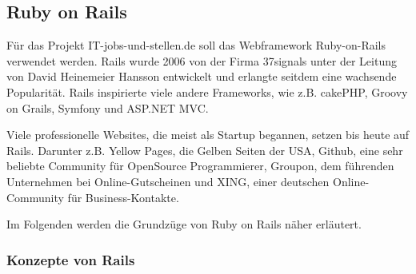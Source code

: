 
\subsection{Ruby on Rails}

Für das Projekt IT-jobs-und-stellen.de soll das Webframework Ruby-on-Rails verwendet werden. Rails wurde 2006 von der Firma 37signals unter der Leitung von David Heinemeier Hansson entwickelt und erlangte seitdem eine wachsende Popularität. Rails inspirierte viele andere Frameworks, wie z.B. cakePHP, Groovy on Grails, Symfony und ASP.NET MVC.

Viele professionelle Websites, die meist als Startup begannen, setzen bis heute auf Rails. Darunter z.B. Yellow Pages, die Gelben Seiten der USA, Github, eine sehr beliebte Community für OpenSource Programmierer,  Groupon, dem führenden Unternehmen bei Online-Gutscheinen und XING, einer deutschen Online-Community für Business-Kontakte.

Im Folgenden werden die Grundzüge von Ruby on Rails näher erläutert.

\subsubsection{Konzepte von Rails}

